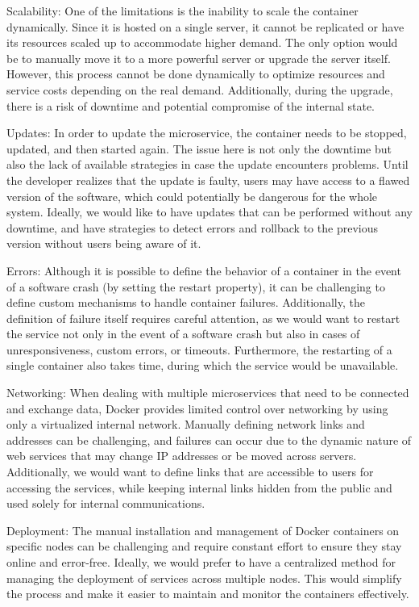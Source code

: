 \documentclass[sigplan,screen]{acmart}
\begin{document}
Scalability: One of the limitations is the inability to scale the container dynamically. Since it is hosted on a single server, it cannot be replicated or have its resources scaled up to accommodate higher demand. The only option would be to manually move it to a more powerful server or upgrade the server itself. However, this process cannot be done dynamically to optimize resources and service costs depending on the real demand. Additionally, during the upgrade, there is a risk of downtime and potential compromise of the internal state.

Updates: In order to update the microservice, the container needs to be stopped, updated, and then started again. The issue here is not only the downtime but also the lack of available strategies in case the update encounters problems. Until the developer realizes that the update is faulty, users may have access to a flawed version of the software, which could potentially be dangerous for the whole system. Ideally, we would like to have updates that can be performed without any downtime, and have strategies to detect errors and rollback to the previous version without users being aware of it.

Errors: Although it is possible to define the behavior of a container in the event of a software crash (by setting the restart property), it can be challenging to define custom mechanisms to handle container failures. Additionally, the definition of failure itself requires careful attention, as we would want to restart the service not only in the event of a software crash but also in cases of unresponsiveness, custom errors, or timeouts. Furthermore, the restarting of a single container also takes time, during which the service would be unavailable.

Networking: When dealing with multiple microservices that need to be connected and exchange data, Docker provides limited control over networking by using only a virtualized internal network. Manually defining network links and addresses can be challenging, and failures can occur due to the dynamic nature of web services that may change IP addresses or be moved across servers. Additionally, we would want to define links that are accessible to users for accessing the services, while keeping internal links hidden from the public and used solely for internal communications.

Deployment: The manual installation and management of Docker containers on specific nodes can be challenging and require constant effort to ensure they stay online and error-free. Ideally, we would prefer to have a centralized method for managing the deployment of services across multiple nodes. This would simplify the process and make it easier to maintain and monitor the containers effectively.
\end{document}
